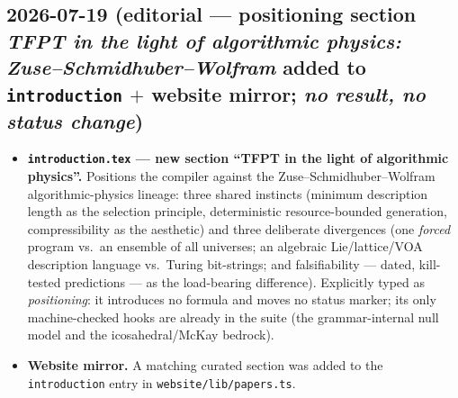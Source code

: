 \subsection*{2026-07-19 (editorial --- positioning section \emph{TFPT in the light of algorithmic physics: Zuse--Schmidhuber--Wolfram} added to \texttt{introduction} $+$ website mirror; \emph{no result, no status change})}
\begin{itemize}[leftmargin=1.5em]
\item \textbf{\texttt{introduction.tex} --- new section ``TFPT in the light of algorithmic physics''.} Positions the
compiler against the Zuse--Schmidhuber--Wolfram algorithmic-physics lineage: three shared instincts (minimum
description length as the selection principle, deterministic resource-bounded generation, compressibility as the
aesthetic) and three deliberate divergences (one \emph{forced} program vs.\ an ensemble of all universes; an
algebraic Lie/lattice/VOA description language vs.\ Turing bit-strings; and falsifiability --- dated, kill-tested
predictions --- as the load-bearing difference). Explicitly typed as \emph{positioning}: it introduces no formula and
moves no status marker; its only machine-checked hooks are already in the suite (the grammar-internal null model and
the icosahedral/McKay bedrock).
\item \textbf{Website mirror.} A matching curated section was added to the \texttt{introduction} entry in
\texttt{website/lib/papers.ts}.
\end{itemize}

